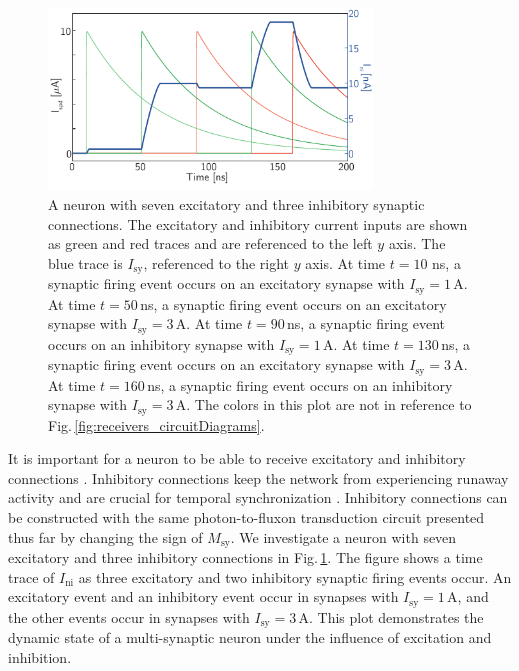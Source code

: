 \documentclass[twocolumn]{article}
\begin{document}
\begin{figure}[t!]
	\centerline{\includegraphics[width=8.6cm]{_receivers_inhibitoryAndExcitatory_small.pdf}}
	\caption{\label{fig:receivers_inhibitoryAndExcitatory}A neuron with seven excitatory and three inhibitory synaptic connections. The excitatory and inhibitory current inputs are shown as green and red traces and are referenced to the left $y$ axis. The blue trace is $I_{\mathrm{sy}}$, referenced to the right $y$ axis. At time $t = 10$ ns, a synaptic firing event occurs on an excitatory synapse with $I_{\mathrm{sy}} = 1$\,\textmu A. At time $t = 50$\,ns, a synaptic firing event occurs on an excitatory synapse with $I_{\mathrm{sy}} = 3$\,\textmu A. At time $t = 90$\,ns, a synaptic firing event occurs on an inhibitory synapse with $I_{\mathrm{sy}} = 1$\,\textmu A. At time $t = 130$\,ns, a synaptic firing event occurs on an excitatory synapse with $I_{\mathrm{sy}} = 3$\,\textmu A. At time $t = 160$\,ns, a synaptic firing event occurs on an inhibitory synapse with $I_{\mathrm{sy}} = 3$\,\textmu A. The colors in this plot are not in reference to Fig.\,\ref{fig:receivers_circuitDiagrams}.}
\end{figure}
It is important for a neuron to be able to receive excitatory and inhibitory connections \cite{vrso1996,sase2000,daab2001,robu2015}. Inhibitory connections keep the network from experiencing runaway activity and are crucial for temporal synchronization \cite{sase2001,vala2001,enfr2001,budr2004,bu2006}. Inhibitory connections can be constructed with the same photon-to-fluxon transduction circuit presented thus far by changing the sign of $M_{\mathrm{sy}}$. We investigate a neuron with seven excitatory and three inhibitory connections in Fig.\,\ref{fig:receivers_inhibitoryAndExcitatory}. The figure shows a time trace of $I_{\mathrm{ni}}$ as three excitatory and two inhibitory synaptic firing events occur. An excitatory event and an inhibitory event occur in synapses with $I_{\mathrm{sy}} = 1$\,\textmu A, and the other events occur in synapses with $I_{\mathrm{sy}} = 3$\,\textmu A. This plot demonstrates the dynamic state of a multi-synaptic neuron under the influence of excitation and inhibition. 
\end{document}
